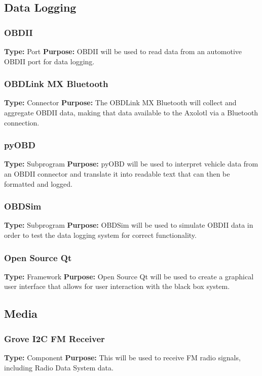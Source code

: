 \documentclass[onecolumn, draftclsnofoot,10pt, compsoc]{IEEEtran}
\begin{document}
\subsection{Data Logging}
\subsubsection{OBDII}
\textbf{Type:} Port \newline
\textbf{Purpose:} OBDII will be used to read data from an automotive OBDII port for data logging.

\subsubsection{OBDLink MX Bluetooth}
\textbf{Type:} Connector \newline
\textbf{Purpose:} The OBDLink MX Bluetooth will collect and aggregate OBDII data, making that data available to the Axolotl via a Bluetooth connection.

\subsubsection{pyOBD}
\textbf{Type:} Subprogram \newline
\textbf{Purpose:} pyOBD will be used to interpret vehicle data from an OBDII connector and translate it into readable text that can then be formatted and logged.

\subsubsection{OBDSim}
\textbf{Type:} Subprogram \newline
\textbf{Purpose:} OBDSim will be used to simulate OBDII data in order to test the data logging system for correct functionality.

\subsubsection{Open Source Qt}
\textbf{Type:} Framework \newline
\textbf{Purpose:} Open Source Qt will be used to create a graphical user interface that allows for user interaction with the black box system.

\subsection{Media}
\subsubsection{Grove I2C FM Receiver}
\textbf{Type:} Component \newline
\textbf{Purpose:} This will be used to receive FM radio signals, including Radio Data System data.
\end{document}
